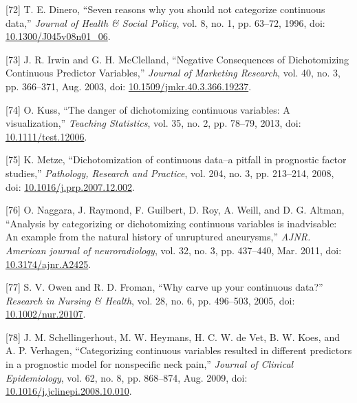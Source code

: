 \documentclass[12pt,PhD,twoside,openright]{muthesis}
\newenvironment{cslreferences}%
  {}%
  {\par}
\begin{document}
\begin{cslreferences}
\leavevmode\hypertarget{ref-dinero_seven_1996-1}{}%
{[}72{]} T. E. Dinero, ``Seven reasons why you should not categorize continuous data,'' \emph{Journal of Health \& Social Policy}, vol. 8, no. 1, pp. 63--72, 1996, doi: \href{https://doi.org/10.1300/J045v08n01_06}{10.1300/J045v08n01\_06}.

\leavevmode\hypertarget{ref-irwin_negative_2003}{}%
{[}73{]} J. R. Irwin and G. H. McClelland, ``Negative Consequences of Dichotomizing Continuous Predictor Variables,'' \emph{Journal of Marketing Research}, vol. 40, no. 3, pp. 366--371, Aug. 2003, doi: \href{https://doi.org/10.1509/jmkr.40.3.366.19237}{10.1509/jmkr.40.3.366.19237}.

\leavevmode\hypertarget{ref-kuss_danger_2013}{}%
{[}74{]} O. Kuss, ``The danger of dichotomizing continuous variables: A visualization,'' \emph{Teaching Statistics}, vol. 35, no. 2, pp. 78--79, 2013, doi: \href{https://doi.org/10.1111/test.12006}{10.1111/test.12006}.

\leavevmode\hypertarget{ref-metze_dichotomization_2008}{}%
{[}75{]} K. Metze, ``Dichotomization of continuous data--a pitfall in prognostic factor studies,'' \emph{Pathology, Research and Practice}, vol. 204, no. 3, pp. 213--214, 2008, doi: \href{https://doi.org/10.1016/j.prp.2007.12.002}{10.1016/j.prp.2007.12.002}.

\leavevmode\hypertarget{ref-naggara_analysis_2011}{}%
{[}76{]} O. Naggara, J. Raymond, F. Guilbert, D. Roy, A. Weill, and D. G. Altman, ``Analysis by categorizing or dichotomizing continuous variables is inadvisable: An example from the natural history of unruptured aneurysms,'' \emph{AJNR. American journal of neuroradiology}, vol. 32, no. 3, pp. 437--440, Mar. 2011, doi: \href{https://doi.org/10.3174/ajnr.A2425}{10.3174/ajnr.A2425}.

\leavevmode\hypertarget{ref-owen_why_2005}{}%
{[}77{]} S. V. Owen and R. D. Froman, ``Why carve up your continuous data?'' \emph{Research in Nursing \& Health}, vol. 28, no. 6, pp. 496--503, 2005, doi: \href{https://doi.org/10.1002/nur.20107}{10.1002/nur.20107}.

\leavevmode\hypertarget{ref-schellingerhout_categorizing_2009}{}%
{[}78{]} J. M. Schellingerhout, M. W. Heymans, H. C. W. de Vet, B. W. Koes, and A. P. Verhagen, ``Categorizing continuous variables resulted in different predictors in a prognostic model for nonspecific neck pain,'' \emph{Journal of Clinical Epidemiology}, vol. 62, no. 8, pp. 868--874, Aug. 2009, doi: \href{https://doi.org/10.1016/j.jclinepi.2008.10.010}{10.1016/j.jclinepi.2008.10.010}.


\end{cslreferences}
\end{document}
